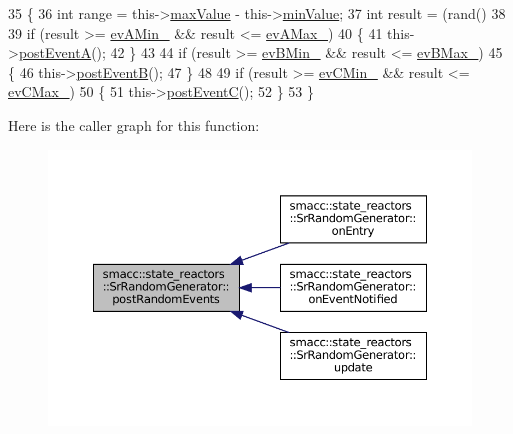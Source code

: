 \begin{DoxyCode}
35 \{
36     \textcolor{keywordtype}{int} range = this->\hyperlink{classsmacc_1_1state__reactors_1_1SrRandomGenerator_a693a1e627efe396dbb4f2849ce14d85d}{maxValue} - this->\hyperlink{classsmacc_1_1state__reactors_1_1SrRandomGenerator_ab2a695fd1f34b17aff3ab36fb38e3765}{minValue};
37     \textcolor{keywordtype}{int} result = (rand() %
38 
39     \textcolor{keywordflow}{if} (result >= \hyperlink{classsmacc_1_1state__reactors_1_1SrRandomGenerator_aaa18a0eec1d0777ea1607b5ac7491495}{evAMin\_} && result <= \hyperlink{classsmacc_1_1state__reactors_1_1SrRandomGenerator_ad5148909923e6761c7de33749f324609}{evAMax\_})
40     \{
41         this->\hyperlink{classsmacc_1_1state__reactors_1_1SrRandomGenerator_ac157de4b848ebc5da1acb593f7b25108}{postEventA}();
42     \}
43 
44     \textcolor{keywordflow}{if} (result >= \hyperlink{classsmacc_1_1state__reactors_1_1SrRandomGenerator_ae1022906bed4d126b7520f81c3e52976}{evBMin\_} && result <= \hyperlink{classsmacc_1_1state__reactors_1_1SrRandomGenerator_ad4b1ecc14ae3d153e3b1fe5006a8a192}{evBMax\_})
45     \{
46         this->\hyperlink{classsmacc_1_1state__reactors_1_1SrRandomGenerator_a0b38db23bf80e0709c2ae51c6a64ac1c}{postEventB}();
47     \}
48 
49     \textcolor{keywordflow}{if} (result >= \hyperlink{classsmacc_1_1state__reactors_1_1SrRandomGenerator_a048ec99a9978b1d51b8ecb96be4800c8}{evCMin\_} && result <= \hyperlink{classsmacc_1_1state__reactors_1_1SrRandomGenerator_af74df138d11468fd2b1d998698fd9503}{evCMax\_})
50     \{
51         this->\hyperlink{classsmacc_1_1state__reactors_1_1SrRandomGenerator_a1aeb07de7b52a9f5811e5f60444731a0}{postEventC}();
52     \}
53 \}
\end{DoxyCode}
Here is the caller graph for this function\+:
\nopagebreak
\begin{figure}[H]
\begin{center}
\leavevmode
\includegraphics[width=350pt]{classsmacc_1_1state__reactors_1_1SrRandomGenerator_a50638c93ca9444fbeecea6e72bc6ac35_icgraph}
\end{center}
\end{figure}
